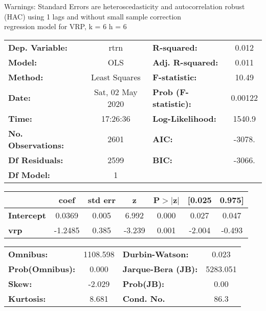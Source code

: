 Warnings: \newline
 [1] Standard Errors are heteroscedasticity and autocorrelation robust (HAC) using 1 lags and without small sample correction\\ 

regression model for VRP, k = 6 h = 6\begin{center}
\begin{tabular}{lclc}
\toprule
\textbf{Dep. Variable:}    &       rtrn       & \textbf{  R-squared:         } &     0.012   \\
\textbf{Model:}            &       OLS        & \textbf{  Adj. R-squared:    } &     0.011   \\
\textbf{Method:}           &  Least Squares   & \textbf{  F-statistic:       } &     10.49   \\
\textbf{Date:}             & Sat, 02 May 2020 & \textbf{  Prob (F-statistic):} &  0.00122    \\
\textbf{Time:}             &     17:26:36     & \textbf{  Log-Likelihood:    } &    1540.9   \\
\textbf{No. Observations:} &        2601      & \textbf{  AIC:               } &    -3078.   \\
\textbf{Df Residuals:}     &        2599      & \textbf{  BIC:               } &    -3066.   \\
\textbf{Df Model:}         &           1      & \textbf{                     } &             \\
\bottomrule
\end{tabular}
\begin{tabular}{lcccccc}
                   & \textbf{coef} & \textbf{std err} & \textbf{z} & \textbf{P$> |$z$|$} & \textbf{[0.025} & \textbf{0.975]}  \\
\midrule
\textbf{Intercept} &       0.0369  &        0.005     &     6.992  &         0.000        &        0.027    &        0.047     \\
\textbf{vrp}       &      -1.2485  &        0.385     &    -3.239  &         0.001        &       -2.004    &       -0.493     \\
\bottomrule
\end{tabular}
\begin{tabular}{lclc}
\textbf{Omnibus:}       & 1108.598 & \textbf{  Durbin-Watson:     } &    0.023  \\
\textbf{Prob(Omnibus):} &   0.000  & \textbf{  Jarque-Bera (JB):  } & 5283.051  \\
\textbf{Skew:}          &  -2.029  & \textbf{  Prob(JB):          } &     0.00  \\
\textbf{Kurtosis:}      &   8.681  & \textbf{  Cond. No.          } &     86.3  \\
\bottomrule
\end{tabular}
\end{center}

